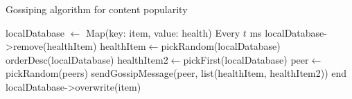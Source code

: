 \begin{algorithm}
\caption{Gossiping algorithm for content popularity}
\label{alg:algorithm-content-popularity}
\begin{algorithmic}
\State localDatabase $\gets$ Map(key: item, value: health)
    \Repeat{} Every $t$ ms
            \State localDatabase->remove(healthItem)
        \EndIf
    \EndFor
    \State healthItem$\gets$pickRandom(localDatabase)
    \State orderDesc(localDatabase)
    \State healthItem2$\gets$pickFirst(localDatabase)
    \State peer$\gets$pickRandom(peers)
    \State sendGossipMessage(peer, list(healthItem, healthItem2))
    \Until end
\EndFunction
{}\Comment{}
    \State localDatabase->overwrite(item)
\EndFunction
\end{algorithmic}
\end{algorithm}